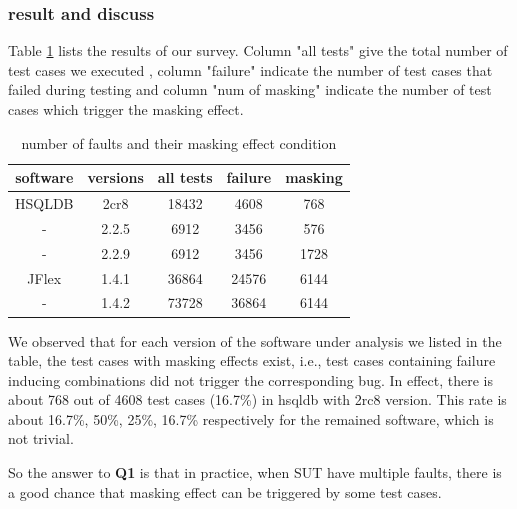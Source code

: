 \documentclass{sig-alternate}
\begin{document}
\subsubsection{result and discuss}

Table \ref{masking effect condition} lists the results of our survey. Column "all tests" give the total number of test cases we executed , column "failure" indicate the number of test cases that failed during testing and column "num of masking" indicate the number of test cases which trigger the masking effect.


\begin{table}\renewcommand{\arraystretch}{1.3}
\caption{number of faults and their masking effect condition}
\label{masking effect condition}
\begin{tabular}{c|c|c|c|c} \hline
software & versions & all tests & failure & masking\\ \hline
HSQLDB & 2cr8 & 18432 & 4608 & 768\\ \hline
     - & 2.2.5 & 6912 & 3456 & 576\\ \hline
     - & 2.2.9 & 6912 & 3456 &1728\\ \hline
JFlex & 1.4.1 & 36864 & 24576 &6144\\ \hline
     -& 1.4.2 & 73728 & 36864 &6144\\ \hline
\hline\end{tabular}
\end{table}

We observed that for each version of the software under analysis we listed in the table, the test cases with masking effects exist, i.e., test cases containing failure inducing combinations did not trigger the corresponding bug. In effect, there is about 768 out of 4608 test cases (16.7\%) in hsqldb with 2rc8 version. This rate is about 16.7\%, 50\%, 25\%, 16.7\% respectively for the remained software, which is not trivial.

So the answer to \textbf{Q1} is that in practice, when SUT have multiple faults, there is a good chance that masking effect can be triggered by some test cases.

%
%
\end{document}
